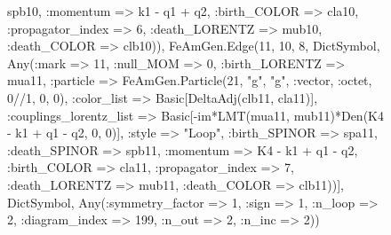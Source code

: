 \documentclass{revtex4}
\begin{document}
\begin{figure}[!htb]
\begin{center}
{spb10, :momentum => k1 - q1 + q2, :birth_COLOR => cla10, :propagator_index => 6, :death_LORENTZ => mub10, :death_COLOR => clb10)), FeAmGen.Edge(11, 10, 8, Dict{Symbol, Any}(:mark => 11, :null_MOM => 0, :birth_LORENTZ => mua11, :particle => FeAmGen.Particle(21, "g", "g", :vector, :octet, 0//1, 0, 0), :color_list => Basic[DeltaAdj(clb11, cla11)], :couplings_lorentz_list => Basic[-im*LMT(mua11, mub11)*Den(K4 - k1 + q1 - q2, 0, 0)], :style => "Loop", :birth_SPINOR => spa11, :death_SPINOR => spb11, :momentum => K4 - k1 + q1 - q2, :birth_COLOR => cla11, :propagator_index => 7, :death_LORENTZ => mub11, :death_COLOR => clb11))], Dict{Symbol, Any}(:symmetry_factor => 1, :sign => 1, :n_loop => 2, :diagram_index => 199, :n_out => 2, :n_inc => 2)) 
}
\end{center}
\end{figure}
\end{document}
